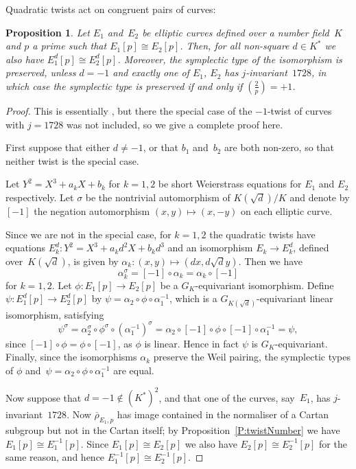 \documentclass[12pt]{amsart}
\newcommand{\rhobar}{{\overline{\rho}}}
\def\legendre#1#2{\left(\displaystyle\frac{#1}{#2}\right)}
\numberwithin{equation}{section}
\newtheorem{proposition}[theorem]{Proposition}
\theoremstyle{definition}
\theoremstyle{remark}
\begin{document}
Quadratic twists act on congruent pairs of curves:
\begin{proposition}\label{P:twist-cong}
Let $E_1$ and~$E_2$ be elliptic curves defined over a number field~$K$
and $p$ a prime such that $E_1[p]\cong E_2[p]$.  Then, for all
non-square $d\in K^*$ we also have $E_1^d[p]\cong E_2^d[p]$.
Moreover, the symplectic type of the isomorphism is preserved, unless
$d=-1$ and exactly one of $E_1$, $E_2$ has $j$-invariant~$1728$, in
which case the symplectic type is preserved if and only if
$\legendre{2}{p}=+1$.
\end{proposition}
\begin{proof}
This is essentially \cite[Lemma~11]{FKSym}, but there the special case
of the $-1$-twist of curves with $j=1728$ was not included, so we give
a complete proof here.

First suppose that either $d\not=-1$, or that $b_1$ and~$b_2$ are both
non-zero, so that neither twist is the special case.

Let $Y^2=X^3+a_kX+b_k$ for $k=1,2$ be short Weierstrass equations for
$E_1$ and $E_2$ respectively.  Let $\sigma$ be the nontrivial
automorphism of $K(\sqrt{d})/K$ and denote by $[-1]$ the negation
automorphism $(x,y)\mapsto(x,-y)$ on each elliptic curve.

Since we are not in the special case, for $k=1,2$ the quadratic twists
have equations $E_k^d:Y^2=X^3+a_kd^2X+b_kd^3$ and an isomorphism
$E_k\to E_k^d$, defined over~$K(\sqrt{d})$, is given by
$\alpha_k:(x,y)\mapsto (dx,d\sqrt{d}y)$.  Then we have
\[
\alpha_k^{\sigma} = [-1]\circ\alpha_k = \alpha_k\circ[-1]
\]
for $k=1,2$.  Let $\phi:E_1[p]\to E_2[p]$ be a $G_K$-equivariant
isomorphism.  Define $\psi:E_1^d[p]\to E_2^d[p]$ by
$\psi=\alpha_2\circ\phi\circ\alpha_1^{-1}$, which is a
$G_{K(\sqrt{d})}$-equivariant linear isomorphism, satisfying
\[
\psi^{\sigma} =
\alpha_2^{\sigma}\circ\phi^{\sigma}\circ(\alpha_1^{-1})^{\sigma} =
\alpha_2\circ[-1]\circ\phi\circ[-1]\circ\alpha_1^{-1} = \psi,
\]
since $[-1]\circ\phi=\phi\circ[-1]$, as $\phi$ is linear.  Hence in
fact $\psi$ is $G_K$-equivariant.  Finally, since the isomorphisms
$\alpha_k$ preserve the Weil pairing, the symplectic types of $\phi$
and~$\psi=\alpha_2\circ\phi\circ\alpha_1^{-1}$ are equal.

Now suppose that $d=-1\notin(K^*)^2$, and that one of the curves,
say~$E_1$, has $j$-invariant~$1728$.  Now $\rhobar_{E_1,p}$ has image
contained in the normaliser of a Cartan subgroup but not in the Cartan
itself; by Proposition~\ref{P:twistNumber} we have $E_1[p]\cong
E_1^{-1}[p]$.  Since $E_1[p]\cong E_2[p]$ we also have $E_2[p]\cong
E_2^{-1}[p]$ for the same reason, and hence $E_1^{-1}[p]\cong
E_2^{-1}[p]$.


\end{proof}
\end{document}
